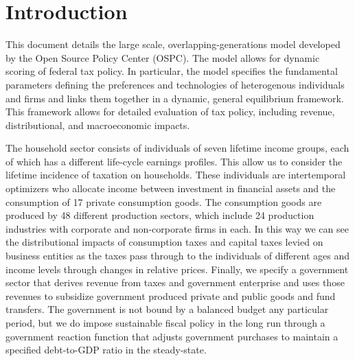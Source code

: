 \documentclass[12pt]{report}
\theoremstyle{definition}
\begin{document}
\begin{titlepage}
\begin{abstract}



  \end{abstract}
  \thispagestyle{empty}
\end{titlepage}


\tableofcontents   %
\listoftables      %
\listoffigures     %



\chapter{Introduction}
%

This document details the large scale, overlapping-generations model developed by the Open Source Policy Center (OSPC).  The model allows for dynamic scoring of federal tax policy.  In particular, the model specifies the  fundamental parameters defining the preferences and technologies of heterogenous individuals and firms and links them together in a dynamic, general equilibrium framework.  This framework allows for detailed evaluation of tax policy, including revenue, distributional, and macroeconomic impacts. 

The household sector consists of individuals of seven lifetime income groups, each of which has a different life-cycle earnings profiles.  This allow us to consider the lifetime incidence of taxation on households.  These individuals are intertemporal optimizers who allocate income between investment in financial assets and the consumption of 17 private consumption goods.  The consumption goods are produced by 48 different production sectors, which include 24 production industries with corporate and non-corporate firms in each.  In this way we can see the distributional impacts of consumption taxes and capital taxes levied on business entities as the taxes pass through to the individuals of different ages and income levels through changes in relative prices.  Finally, we specify a government sector that derives revenue from taxes and government enterprise and uses those revenues to subsidize government produced private and public goods and fund transfers.  The government is not bound by a balanced budget any particular period, but we do impose sustainable fiscal policy in the long run through a government reaction function that adjusts government purchases to maintain a specified debt-to-GDP ratio in the steady-state.
\end{document}
